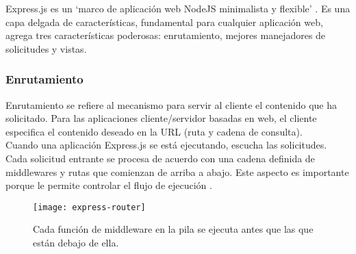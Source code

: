 Express.js es un `marco de aplicación web NodeJS minimalista y flexible' \cite{express}. Es una capa delgada de características, fundamental para cualquier aplicación web, agrega tres características poderosas: enrutamiento, mejores manejadores de solicitudes y vistas.

\subsubsection{Enrutamiento}
Enrutamiento se refiere al mecanismo para servir al cliente el contenido que ha solicitado. Para las aplicaciones cliente/servidor basadas en web, el cliente especifica el contenido deseado en la URL (ruta y cadena de consulta).\\[0.8cm]
Cuando una aplicación Express.js se está ejecutando, escucha las solicitudes. Cada solicitud entrante se procesa de acuerdo con una cadena definida de middlewares y rutas que comienzan de arriba a abajo. Este aspecto es importante porque le permite controlar el flujo de ejecución \cite{azat}.
\vspace{0.8cm}

\begin{figure}[H]
  \centering
  \texttt{[image: express-router]}
  \caption{Cada función de middleware en la pila se ejecuta antes que las que están debajo de ella.}
\end{figure}

\newpage

